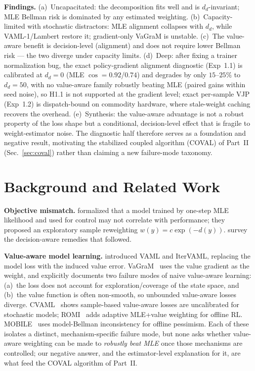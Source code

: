 \documentclass{article}
\theoremstyle{plain}
\begin{document}
\textbf{Findings.}
(a)~Uncapacitated: the decomposition fits well and is $d_d$-invariant; MLE Bellman risk
is dominated by any estimated weighting.
(b)~Capacity-limited with stochastic distractors: MLE alignment collapses with $d_d$,
while VAML-1/Lambert restore it; gradient-only VaGraM is unstable.
(c)~The value-aware benefit is decision-level (alignment) and does not require lower
Bellman risk --- the two diverge under capacity limits.
(d)~Deep: after fixing a trainer normalization bug, the exact policy-gradient
alignment diagnostic (Exp~1.1) is calibrated at $d_d = 0$ (MLE $\cos = 0.92$/$0.74$) and
degrades by only $15$--$25\%$ to $d_d = 50$, with no value-aware family robustly beating
MLE (paired gains within seed noise), so H1.1 is not supported at the gradient level;
exact per-sample VJP (Exp~1.2) is dispatch-bound on commodity hardware, where
stale-weight caching recovers the overhead.
(e)~Synthesis: the value-aware advantage is not a robust property of the loss shape but a
conditional, decision-level effect that is fragile to weight-estimator noise. The
diagnostic half therefore serves as a foundation and negative result, motivating the
stabilized coupled algorithm (COVAL) of Part~II (Sec.~\ref{sec:coval}) rather than
claiming a new failure-mode taxonomy.

\section{Background and Related Work}

\textbf{Objective mismatch.} \citet{lambert2020objective} formalized that a
model trained by one-step MLE likelihood and used for control may not correlate with
performance; they proposed an exploratory sample reweighting $w(y) = c \exp(-d(y))$.
\citet{wei2024unified} survey the decision-aware remedies that followed.

\textbf{Value-aware model learning.} \citet{farahmand2017vaml,farahmand2018itervaml}
introduced VAML and IterVAML, replacing the model loss with the induced value error.
VaGraM~\citep{voelcker2022vagram} uses the value gradient as the weight, and explicitly
documents two failure modes of naive value-aware learning: (a)~the loss does not account
for exploration/coverage of the state space, and (b)~the value function is often
non-smooth, so unbounded value-aware losses diverge. CVAML~\citep{cvaml2025} shows
sample-based value-aware losses are uncalibrated for stochastic models; ROMI~\citep{romi2026}
adds adaptive MLE+value weighting for offline RL. MOBILE~\citep{sun2023mobile} uses
model-Bellman inconsistency for offline pessimism. Each of these isolates a distinct,
mechanism-specific failure mode, but none asks whether value-aware weighting can be made
to \emph{robustly beat MLE} once those mechanisms are controlled; our negative answer,
and the estimator-level explanation for it, are what feed the COVAL algorithm of Part~II.
\end{document}
